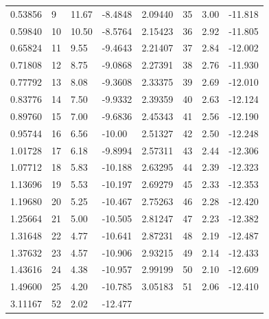 \documentclass[10pt, a4paper]{article}
\begin{document}
\begin{appendices}
\begin{table}[H]
\begin{small}
\begin{center}
\begin{tabular}{|p{15mm} p{15mm} p{15mm} p{15mm} || p{15mm} p{15mm}p{15mm} p{15mm}|}
 0.53856     &  9     &      11.67   &      -8.4848  & 2.09440    &  35    &        3.00    &     -11.818\\ 
 0.59840     & 10    &       10.50  &       -8.5764 &    2.15423    &  36    &        2.92    &     -11.805\\ 
 0.65824     & 11    &        9.55   &      -9.4643 &  2.21407    &  37    &        2.84    &     -12.002\\ 
 0.71808     & 12    &        8.75   &      -9.0868 &  2.27391    &  38    &        2.76    &     -11.930\\ 
 0.77792     & 13    &        8.08   &      -9.3608 &  2.33375    &  39    &        2.69    &     -12.010\\ 
 0.83776     & 14    &        7.50     &    -9.9332 &  2.39359    &  40    &        2.63    &     -12.124\\ 
 0.89760     & 15    &        7.00     &    -9.6836 &  2.45343    &  41    &        2.56    &     -12.190\\ 
 0.95744     & 16    &        6.56     &    -10.00  & 2.51327    &  42           & 2.50    &     -12.248\\ 
 1.01728     & 17    &        6.18     &    -9.8994 & 2.57311    &  43      &      2.44    &     -12.306\\ 
 1.07712     & 18    &        5.83     &    -10.188 & 2.63295    &  44      &      2.39    &     -12.323\\ 
 1.13696     & 19    &        5.53     &    -10.197 & 2.69279    &  45      &      2.33    &     -12.353\\ 
 1.19680     & 20    &        5.25     &    -10.467 &  2.75263    &  46      &      2.28    &     -12.420\\ 
 1.25664     & 21    &        5.00     &    -10.505 &  2.81247    &  47      &      2.23    &     -12.382\\ 
 1.31648     & 22    &        4.77    &    -10.641 &  2.87231    &  48      &      2.19    &     -12.487\\ 
 1.37632     & 23    &        4.57     &    -10.906 &  2.93215    &  49      &    2.14      &   -12.433\\ 
 1.43616     & 24    &        4.38     &    -10.957 &  2.99199    &  50        &    2.10    &     -12.609\\ 
 1.49600      &25    &        4.20     &    -10.785 &   3.05183    &  51      &      2.06    &     -12.410\\ 
 3.11167    &  52      &      2.02    &     -12.477 & & & & \\   \hline \hline

\end{tabular}
\end{center}
\end{small}
\end{table}
\end{appendices}
\end{document}
